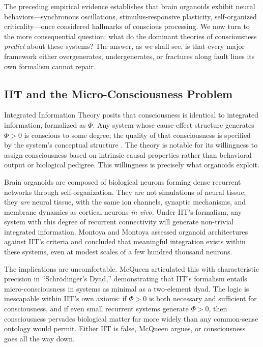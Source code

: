 
The preceding empirical evidence establishes that brain organoids exhibit neural behaviors---synchronous oscillations, stimulus-responsive plasticity, self-organized criticality---once considered hallmarks of conscious processing. We now turn to the more consequential question: what do the dominant theories of consciousness \textit{predict} about these systems? The answer, as we shall see, is that every major framework either overgenerates, undergenerates, or fractures along fault lines its own formalism cannot repair.

\subsection{IIT and the Micro-Consciousness Problem}

Integrated Information Theory posits that consciousness is identical to integrated information, formalized as $\Phi$. Any system whose cause-effect structure generates $\Phi > 0$ is conscious to some degree; the quality of that consciousness is specified by the system's conceptual structure \cite{tononi2004information, tononi2016integrated, albantakis2023iit4}. The theory is notable for its willingness to assign consciousness based on intrinsic causal properties rather than behavioral output or biological pedigree. This willingness is precisely what organoids exploit.

Brain organoids are composed of biological neurons forming dense recurrent networks through self-organization. They are not simulations of neural tissue; they \textit{are} neural tissue, with the same ion channels, synaptic mechanisms, and membrane dynamics as cortical neurons \textit{in vivo}. Under IIT's formalism, any system with this degree of recurrent connectivity will generate non-trivial integrated information. Montoya and Montoya \cite{montoya2023iit} assessed organoid architectures against IIT's criteria and concluded that meaningful integration exists within these systems, even at modest scales of a few hundred thousand neurons.

The implications are uncomfortable. McQueen \cite{mcqueen2023schrodinger} articulated this with characteristic precision in ``Schr\"{o}dinger's Dyad,'' demonstrating that IIT's formalism entails micro-consciousness in systems as minimal as a two-element dyad. The logic is inescapable within IIT's own axioms: if $\Phi > 0$ is both necessary and sufficient for consciousness, and if even small recurrent systems generate $\Phi > 0$, then consciousness pervades biological matter far more widely than any common-sense ontology would permit. Either IIT is false, McQueen argues, or consciousness goes all the way down.

